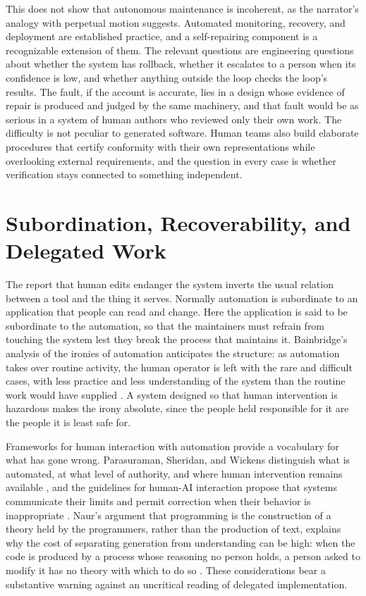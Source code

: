 \documentclass[11pt]{article}
\theoremstyle{remark}
\begin{document}
This does not show that autonomous maintenance is incoherent, as the narrator's analogy with perpetual motion suggests. Automated monitoring, recovery, and deployment are established practice, and a self-repairing component is a recognizable extension of them. The relevant questions are engineering questions about whether the system has rollback, whether it escalates to a person when its confidence is low, and whether anything outside the loop checks the loop's results. The fault, if the account is accurate, lies in a design whose evidence of repair is produced and judged by the same machinery, and that fault would be as serious in a system of human authors who reviewed only their own work. The difficulty is not peculiar to generated software. Human teams also build elaborate procedures that certify conformity with their own representations while overlooking external requirements, and the question in every case is whether verification stays connected to something independent.

\section{Subordination, Recoverability, and Delegated Work}

The report that human edits endanger the system inverts the usual relation between a tool and the thing it serves. Normally automation is subordinate to an application that people can read and change. Here the application is said to be subordinate to the automation, so that the maintainers must refrain from touching the system lest they break the process that maintains it. Bainbridge's analysis of the ironies of automation anticipates the structure: as automation takes over routine activity, the human operator is left with the rare and difficult cases, with less practice and less understanding of the system than the routine work would have supplied \cite{bainbridge1983}. A system designed so that human intervention is hazardous makes the irony absolute, since the people held responsible for it are the people it is least safe for.

Frameworks for human interaction with automation provide a vocabulary for what has gone wrong. Parasuraman, Sheridan, and Wickens distinguish what is automated, at what level of authority, and where human intervention remains available \cite{parasuraman2000}, and the guidelines for human-AI interaction propose that systems communicate their limits and permit correction when their behavior is inappropriate \cite{amershi2019}. Naur's argument that programming is the construction of a theory held by the programmers, rather than the production of text, explains why the cost of separating generation from understanding can be high: when the code is produced by a process whose reasoning no person holds, a person asked to modify it has no theory with which to do so \cite{naur1985}. These considerations bear a substantive warning against an uncritical reading of delegated implementation.
\end{document}

